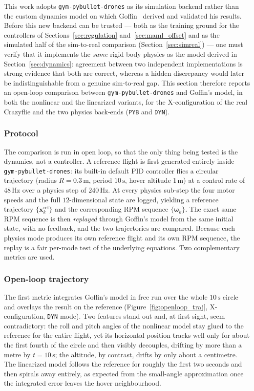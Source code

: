 \documentclass[11pt,a4paper]{article}
\theoremstyle{remark}
\numberwithin{equation}{section}
\begin{document}
This work adopts \texttt{gym-pybullet-drones} as its simulation backend rather than the
custom dynamics model on which Goffin~\cite{goffin2026} derived and validated his results.
Before this new backend can be trusted --- both as the training ground for the controllers of
Sections~\ref{sec:regulation} and~\ref{sec:maml_offset} and as the simulated half of the
sim-to-real comparison (Section~\ref{sec:simreal}) --- one must verify that it implements the
\emph{same} rigid-body physics as the model derived in Section~\ref{sec:dynamics}: agreement
between two independent implementations is strong evidence that both are correct, whereas a
hidden discrepancy would later be indistinguishable from a genuine sim-to-real gap. This
section therefore reports an open-loop comparison between \texttt{gym-pybullet-drones} and
Goffin's model, in both the nonlinear and the linearized variants, for the
X-configuration of the real Crazyflie and the two physics back-ends
(\texttt{PYB} and \texttt{DYN}).

\subsubsection*{Protocol}

The comparison is run in open loop, so that the only thing being tested is the
dynamics, not a controller. A reference flight is first generated entirely
inside \texttt{gym-pybullet-drones}: its built-in default PID controller flies a
circular trajectory (radius
$R = 0.3\,\mathrm{m}$, period $10\,\mathrm{s}$, hover altitude $1\,\mathrm{m}$) at
a control rate of $48\,\mathrm{Hz}$ over a physics step of $240\,\mathrm{Hz}$.
At every physics sub-step the four motor speeds and the full $12$-dimensional
state are logged, yielding a reference trajectory $\{\mathbf{x}_k^{\mathrm{ref}}\}$
and the corresponding RPM sequence $\{\boldsymbol{\omega}_k\}$. The exact same
RPM sequence is then \emph{replayed} through Goffin's model from the same initial
state, with no feedback, and the two trajectories are compared. Because each
physics mode produces its own reference flight and its own RPM sequence, the
replay is a fair per-mode test of the underlying equations. Two complementary
metrics are used.

\subsubsection*{Open-loop trajectory}

The first metric integrates Goffin's model in free run over the whole
$10\,\mathrm{s}$ circle and overlays the result on the reference
(Figure~\ref{fig:openloop_traj}, X-configuration, \texttt{DYN} mode). Two
features stand out and, at first sight, seem contradictory: the roll and pitch
angles of the nonlinear model stay glued to the reference for the entire flight,
yet its horizontal position tracks well only for about the first fourth of the
circle and then visibly decouples, drifting by more than a metre by
$t = 10\,\mathrm{s}$; the altitude, by contrast, drifts by only about a
centimetre. The linearized model follows the reference for roughly the
first two seconds and then spirals away entirely, as expected from the
small-angle approximation once the integrated error leaves the hover
neighbourhood.
\end{document}
